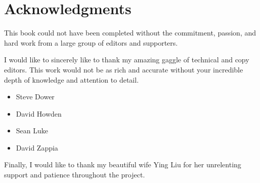 % 
% 
\section*{Acknowledgments}
This book could not have been completed without the commitment, passion, and hard work from a large group of editors and supporters.

I would like to sincerely like to thank my amazing gaggle of technical and copy editors. This work would not be as rich and accurate without your incredible depth of knowledge and attention to detail.

\begin{itemize}
	\item Steve Dower
	\item David Howden
	\item Sean Luke
	\item David Zappia
\end{itemize}

Finally, I would like to thank my beautiful wife Ying Liu for her unrelenting support and patience throughout the project.